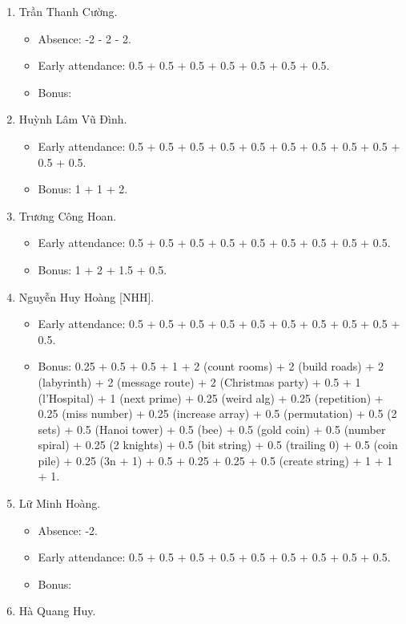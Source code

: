 \documentclass{article}
\begin{document}
\begin{enumerate}
	\item {\sc Trần Thanh Cường.}
	\begin{itemize}
		\item Absence: -2 - 2 - 2.
		\item Early attendance: 0.5 + 0.5 + 0.5 + 0.5 + 0.5 + 0.5 + 0.5.
		\item Bonus:
	\end{itemize}
	\item {\sc Huỳnh Lâm Vũ Đình.}
	\begin{itemize}
		\item Early attendance: 0.5 + 0.5 + 0.5 + 0.5 + 0.5 + 0.5 + 0.5 + 0.5 + 0.5 + 0.5 + 0.5.
		\item Bonus: 1 + 1 + 2.
	\end{itemize}
	\item {\sc Trương Công Hoan.}
	\begin{itemize}
		\item Early attendance: 0.5 + 0.5 + 0.5 + 0.5 + 0.5 + 0.5 + 0.5 + 0.5 + 0.5.
		\item Bonus: 1 + 2 + 1.5 + 0.5.
	\end{itemize}
	\item {\sc Nguyễn Huy Hoàng [NHH].}
	\begin{itemize}
		\item Early attendance: 0.5 + 0.5 + 0.5 + 0.5 + 0.5 + 0.5 + 0.5 + 0.5 + 0.5 + 0.5.
		\item Bonus: 0.25 + 0.5 + 0.5 + 1 + 2 (count rooms) + 2 (build roads) + 2 (labyrinth) + 2 (message route) + 2 (Christmas party) + 0.5 + 1 (l'Hospital) + 1 (next prime) + 0.25 (weird alg) + 0.25 (repetition) + 0.25 (miss number) + 0.25 (increase array) + 0.5 (permutation) + 0.5 (2 sets) + 0.5 (Hanoi tower) + 0.5 (bee) + 0.5 (gold coin) + 0.5 (number spiral) + 0.25 (2 knights) + 0.5 (bit string) + 0.5 (trailing 0) + 0.5 (coin pile) + 0.25 (3n + 1) + 0.5 + 0.25 + 0.25 + 0.5 (create string) + 1 + 1 + 1.
	\end{itemize}
	\item {\sc Lữ Minh Hoàng.}
	\begin{itemize}
        \item Absence: -2.
		\item Early attendance: 0.5 + 0.5 + 0.5 + 0.5 + 0.5 + 0.5 + 0.5 + 0.5 + 0.5.
		\item Bonus:
	\end{itemize}
	\item {\sc Hà Quang Huy.}
	\begin{itemize}

\end{itemize}
\end{enumerate}
\end{document}
